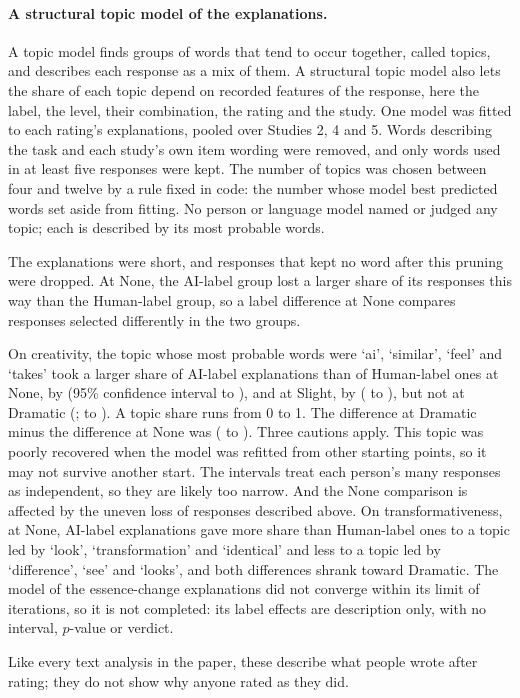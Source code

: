 \paragraph*{A structural topic model of the explanations.}
A topic model finds groups of words that tend to occur together, called topics, and describes each response as a mix of them. A structural topic model also lets the share of each topic depend on recorded features of the response, here the label, the level, their combination, the rating and the study. One model was fitted to each rating's explanations, pooled over Studies 2, 4 and 5. Words describing the task and each study's own item wording were removed, and only words used in at least five responses were kept. The number of topics was chosen between four and twelve by a rule fixed in code: the number whose model best predicted words set aside from fitting. No person or language model named or judged any topic; each is described by its most probable words.

The explanations were short, and responses that kept no word after this pruning were dropped. At None, the AI-label group lost a larger share of its responses this way than the Human-label group, so a label difference at None compares responses selected differently in the two groups.

On creativity, the topic whose most probable words were `ai', `similar', `feel' and `takes' took a larger share of AI-label explanations than of Human-label ones at None, by \XSTopicCreatSevenNoneEst{} (95\% confidence interval \XSTopicCreatSevenNoneLo{} to \XSTopicCreatSevenNoneHi), and at Slight, by \XSTopicCreatSevenSlightEst{} (\XSTopicCreatSevenSlightLo{} to \XSTopicCreatSevenSlightHi), but not at Dramatic (\XSTopicCreatSevenDramaticEst; \XSTopicCreatSevenDramaticLo{} to \XSTopicCreatSevenDramaticHi). A topic share runs from 0 to 1. The difference at Dramatic minus the difference at None was \XSTopicCreatSevenChangeEst{} (\XSTopicCreatSevenChangeLo{} to \XSTopicCreatSevenChangeHi). Three cautions apply. This topic was poorly recovered when the model was refitted from other starting points, so it may not survive another start. The intervals treat each person's many responses as independent, so they are likely too narrow. And the None comparison is affected by the uneven loss of responses described above. On transformativeness, at None, AI-label explanations gave more share than Human-label ones to a topic led by `look', `transformation' and `identical' and less to a topic led by `difference', `see' and `looks', and both differences shrank toward Dramatic. The model of the essence-change explanations did not converge within its limit of iterations, so it is not completed: its label effects are description only, with no interval, $p$-value or verdict.

Like every text analysis in the paper, these describe what people wrote after rating; they do not show why anyone rated as they did.
